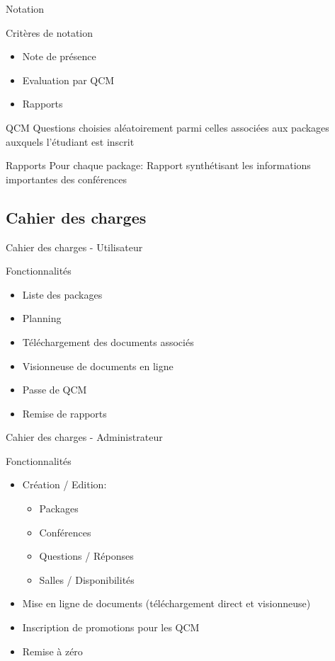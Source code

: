 \begin{frame}{Notation}
    \begin{block}{Critères de notation}
    \begin{itemize}
    \item Note de présence
    \item Evaluation par QCM
    \item Rapports
    \end{itemize}
    \end{block}

    \begin{block}{QCM}
    Questions choisies aléatoirement parmi celles associées aux packages auxquels l'étudiant est inscrit
    \end{block}

    \begin{block}{Rapports}
    Pour chaque package: Rapport synthétisant les informations importantes des conférences
    \end{block}
\end{frame}

\subsection{Cahier des charges}
\begin{frame}{Cahier des charges - Utilisateur}
    \begin{block}{Fonctionnalités}
    \begin{itemize}
    \item Liste des packages
    \item Planning
    \item Téléchargement des documents associés
    \item Visionneuse de documents en ligne
    \item Passe de QCM
    \item Remise de rapports
    \end{itemize}
    \end{block}
\end{frame}

\begin{frame}{Cahier des charges - Administrateur}
    \begin{block}{Fonctionnalités}
    \begin{itemize}
    \item Création / Edition:
            \begin{itemize}
            \item Packages
            \item Conférences
            \item Questions / Réponses
            \item Salles / Disponibilités
            \end{itemize}
    \item Mise en ligne de documents (téléchargement direct et visionneuse)
    \item Inscription de promotions pour les QCM
    \item Remise à zéro
    \end{itemize}
    \end{block}
\end{frame}

